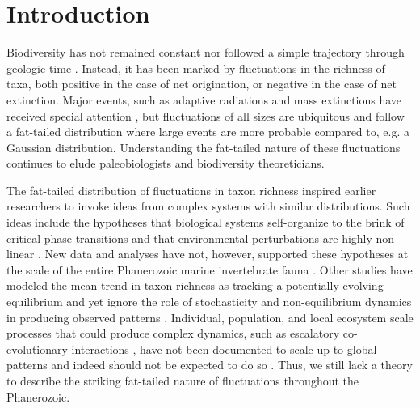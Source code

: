 \documentclass[12pt]{article}
\let\citep=\cite
\begin{document}
\section{Introduction}

Biodiversity has not remained constant nor followed a simple
trajectory through geologic time \citep{raup1982, sepkoski1984,
  gilinsky1994, liow2007, alroy08}.  Instead, it has been marked by
fluctuations in the richness of taxa, both positive in the case of net
origination, or negative in the case of net extinction. Major events,
such as adaptive radiations and mass extinctions have received special
attention \citep{benton1995, Erwin1998}, but fluctuations of all sizes
are ubiquitous \citep{sepkoski1984, alroy08, quental2013} and follow a
fat-tailed distribution where large events are more probable compared
to, e.g. a Gaussian distribution. Understanding the fat-tailed nature
of these fluctuations continues to elude paleobiologists and
biodiversity theoreticians.

The fat-tailed distribution of fluctuations in taxon richness inspired
earlier researchers to invoke ideas from complex systems with similar
distributions. Such ideas include the hypotheses that biological
systems self-organize to the brink of critical phase-transitions
\citep{bak1993, sole1997} and that environmental perturbations are
highly non-linear \citep{newman1995}. New data and analyses have not,
however, supported these hypotheses at the scale of the entire
Phanerozoic marine invertebrate fauna \citep{kirchner1998, alroy08}.
Other studies have modeled the mean trend in taxon richness as
tracking a potentially evolving equilibrium \citep{sepkoski1984,
  alroy2010, rabosky2009ecolLett, marshall2016} and yet ignore the
role of stochasticity and non-equilibrium dynamics in producing
observed patterns \citep{erwin2012, liow2007, quental2013, harmon2015,
  jordan2016}. Individual, population, and local ecosystem scale
processes that could produce complex dynamics, such as escalatory
co-evolutionary interactions \citep{vermeij1987}, have not been
documented to scale up to global patterns \citep{madin2006} and indeed
should not be expected to do so \citep{vermeij2008}.  Thus, we still
lack a theory to describe the striking fat-tailed nature of
fluctuations throughout the Phanerozoic.
\end{document}
